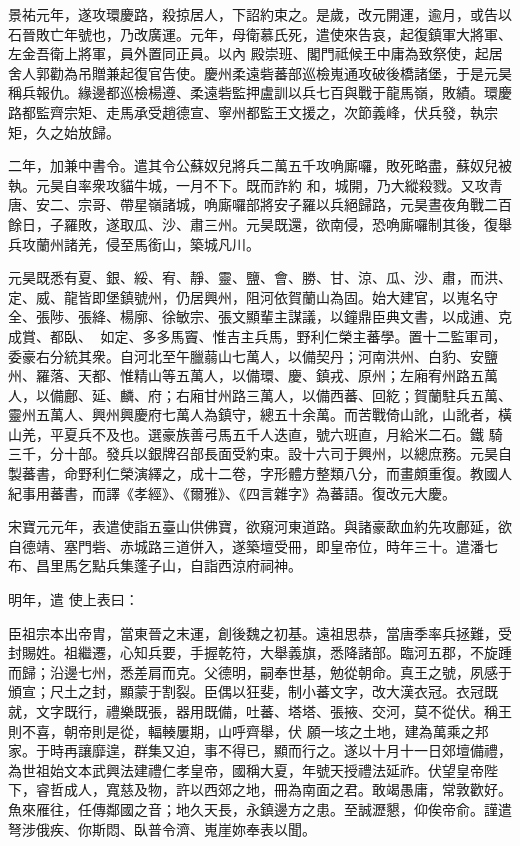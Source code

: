\begin{pinyinscope}
 景祐元年，遂攻環慶路，殺掠居人，下詔約束之。是歲，改元開運，逾月，或告以石晉敗亡年號也，乃改廣運。元年，母衛慕氏死，遣使來告哀，起復鎮軍大將軍、左金吾衛上將軍，員外置同正員。以內
 殿崇班、閣門祗候王中庸為致祭使，起居舍人郭勸為吊贈兼起復官告使。慶州柔遠砦蕃部巡檢嵬通攻破後橋諸堡，于是元昊稱兵報仇。緣邊都巡檢楊遵、柔遠砦監押盧訓以兵七百與戰于龍馬嶺，敗績。環慶路都監齊宗矩、走馬承受趙德宣、寧州都監王文援之，次節義峰，伏兵發，執宗矩，久之始放歸。



 二年，加兼中書令。遣其令公蘇奴兒將兵二萬五千攻唃廝囉，敗死略盡，蘇奴兒被執。元昊自率衆攻貓牛城，一月不下。既而詐約
 和，城開，乃大縱殺戮。又攻青唐、安二、宗哥、帶星嶺諸城，唃廝囉部將安子羅以兵絕歸路，元昊晝夜角戰二百餘日，子羅敗，遂取瓜、沙、肅三州。元昊既還，欲南侵，恐唃廝囉制其後，復舉兵攻蘭州諸羌，侵至馬銜山，築城凡川。



 元昊既悉有夏、銀、綏、宥、靜、靈、鹽、會、勝、甘、涼、瓜、沙、肅，而洪、定、威、龍皆即堡鎮號州，仍居興州，阻河依賀蘭山為固。始大建官，以嵬名守全、張陟、張絳、楊廓、徐敏宗、張文顯輩主謀議，以鐘鼎臣典文書，以成逋、克成賞、都臥、
 𡗀如定、多多馬竇、惟吉主兵馬，野利仁榮主蕃學。置十二監軍司，委豪右分統其衆。自河北至午臘蒻山七萬人，以備契丹；河南洪州、白豹、安鹽州、羅落、天都、惟精山等五萬人，以備環、慶、鎮戎、原州；左廂宥州路五萬人，以備鄜、延、麟、府；右廂甘州路三萬人，以備西蕃、回紇；賀蘭駐兵五萬、靈州五萬人、興州興慶府七萬人為鎮守，總五十余萬。而苦戰倚山訛，山訛者，橫山羌，平夏兵不及也。選豪族善弓馬五千人迭直，號六班直，月給米二石。鐵
 騎三千，分十部。發兵以銀牌召部長面受約束。設十六司于興州，以總庶務。元昊自製蕃書，命野利仁榮演繹之，成十二卷，字形體方整類八分，而畫頗重復。教國人紀事用蕃書，而譯《孝經》、《爾雅》、《四言雜字》為蕃語。復改元大慶。



 宋寶元元年，表遣使詣五臺山供佛寶，欲窺河東道路。與諸豪歃血約先攻鄜延，欲自德靖、塞門砦、赤城路三道併入，遂築壇受冊，即皇帝位，時年三十。遣潘七布、昌里馬乞點兵集蓬子山，自詣西涼府祠神。



 明年，遣
 使上表曰：



 臣祖宗本出帝胄，當東晉之末運，創後魏之初基。遠祖思恭，當唐季率兵拯難，受封賜姓。祖繼遷，心知兵要，手握乾符，大舉義旗，悉降諸部。臨河五郡，不旋踵而歸；沿邊七州，悉差肩而克。父德明，嗣奉世基，勉從朝命。真王之號，夙感于頒宣；尺土之封，顯蒙于割裂。臣偶以狂斐，制小蕃文字，改大漢衣冠。衣冠既就，文字既行，禮樂既張，器用既備，吐蕃、塔塔、張掖、交河，莫不從伏。稱王則不喜，朝帝則是從，輻輳屢期，山呼齊舉，伏
 願一垓之土地，建為萬乘之邦家。于時再讓靡遑，群集又迫，事不得已，顯而行之。遂以十月十一日郊壇備禮，為世祖始文本武興法建禮仁孝皇帝，國稱大夏，年號天授禮法延祚。伏望皇帝陛下，睿哲成人，寬慈及物，許以西郊之地，冊為南面之君。敢竭愚庸，常敦歡好。魚來雁往，任傳鄰國之音；地久天長，永鎮邊方之患。至誠瀝懇，仰俟帝俞。謹遣弩涉俄疾、你斯悶、臥普令濟、嵬崖妳奉表以聞。




\end{pinyinscope}
